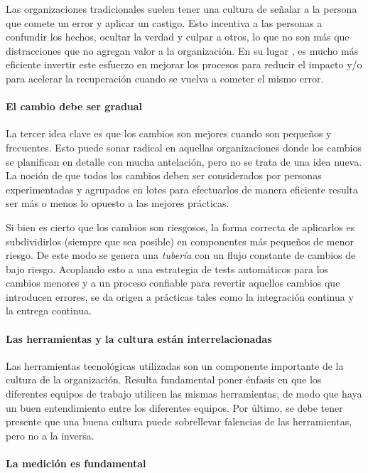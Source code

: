 Las organizaciones tradicionales suelen tener una cultura de señalar a la persona que comete un error y aplicar un castigo. Esto incentiva a las personas a confundir los hechos, ocultar la verdad y culpar a otros, lo que no son más que distracciones que no agregan valor a la organización. En su lugar	, es mucho más eficiente invertir este esfuerzo en mejorar los procesos para reducir el impacto y/o para acelerar la recuperación cuando se vuelva a cometer el mismo error.

\paragraph{El cambio debe ser gradual}

La tercer idea clave es que los cambios son mejores cuando son pequeños y frecuentes. Esto puede sonar radical en aquellas organizaciones donde los cambios se planifican en detalle con mucha antelación, pero no se trata de una idea nueva. La noción de que todos los cambios deben ser considerados por personas experimentadas y agrupados en lotes para  efectuarlos de manera eficiente resulta ser más o menos lo opuesto a las mejores prácticas.

Si bien es cierto que los cambios son riesgosos, la forma correcta de aplicarlos es subdividirlos (siempre que sea posible) en componentes más pequeños de menor riesgo. De este modo se genera una \textit{tubería} con un flujo constante de cambios de bajo riesgo. Acoplando esto a una estrategia de tests automáticos para los cambios menores y a un proceso confiable para revertir aquellos cambios que introducen errores, se da origen a prácticas tales como la integración continua y la entrega continua.

\paragraph{Las herramientas y la cultura están interrelacionadas}

Las herramientas tecnológicas utilizadas son un componente importante de la cultura de la organización. Resulta fundamental poner énfasis en que los diferentes equipos de trabajo utilicen las mismas herramientas, de modo que haya un buen entendimiento entre los diferentes equipos. Por último, se debe tener presente que una buena cultura puede sobrellevar falencias de las herramientas, pero no a la inversa.

\paragraph{La medición es fundamental}


